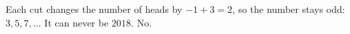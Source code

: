 Each cut changes the number of heads by $-1+3=2$, so the number stays odd: $3,5,7,\dots$ It can never be $2018$. $\boxed{\text{No}}$.
